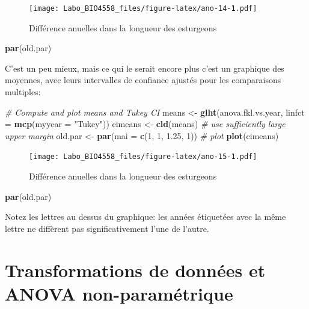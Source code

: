 \documentclass[12pt,]{book}
\newenvironment{Shaded}{\begin{snugshade}}{\end{snugshade}}
\newcommand{\CommentTok}[1]{\textcolor[rgb]{0.37,0.37,0.37}{\textit{#1}}}
\newcommand{\DataTypeTok}[1]{\textcolor[rgb]{0.27,0.27,0.27}{#1}}
\newcommand{\DecValTok}[1]{\textcolor[rgb]{0.06,0.06,0.06}{#1}}
\newcommand{\FloatTok}[1]{\textcolor[rgb]{0.06,0.06,0.06}{#1}}
\newcommand{\KeywordTok}[1]{\textcolor[rgb]{0.27,0.27,0.27}{\textbf{#1}}}
\newcommand{\NormalTok}[1]{#1}
\newcommand{\StringTok}[1]{\textcolor[rgb]{0.5,0.5,0.5}{#1}}
\begin{document}
\begin{figure}
\centering
\texttt{[image: Labo\_BIO4558\_files/figure-latex/ano-14-1.pdf]}
\caption{\label{fig:ano-14}Différence anuelles dans la longueur des esturgeons}
\end{figure}

\begin{Shaded}
\begin{Highlighting}[]
\KeywordTok{par}\NormalTok{(old.par)}
\end{Highlighting}
\end{Shaded}

C'est un peu mieux, mais ce qui le serait encore plus c'est un graphique des moyennes, avec leurs intervalles de confiance ajustés pour les comparaisons multiples:

\begin{Shaded}
\begin{Highlighting}[]
\CommentTok{# Compute and plot means and Tukey CI}
\NormalTok{means <-}\StringTok{ }\KeywordTok{glht}\NormalTok{(anova.fkl.vs.year, }\DataTypeTok{linfct =} \KeywordTok{mcp}\NormalTok{(}\DataTypeTok{myyear =}
\StringTok{"Tukey"}\NormalTok{))}
\NormalTok{cimeans <-}\StringTok{ }\KeywordTok{cld}\NormalTok{(means)}
\CommentTok{# use sufficiently large upper margin}
\NormalTok{old.par <-}\StringTok{ }\KeywordTok{par}\NormalTok{(}\DataTypeTok{mai =} \KeywordTok{c}\NormalTok{(}\DecValTok{1}\NormalTok{, }\DecValTok{1}\NormalTok{, }\FloatTok{1.25}\NormalTok{, }\DecValTok{1}\NormalTok{))}
\CommentTok{# plot}
\KeywordTok{plot}\NormalTok{(cimeans)}
\end{Highlighting}
\end{Shaded}

\begin{figure}
\centering
\texttt{[image: Labo\_BIO4558\_files/figure-latex/ano-15-1.pdf]}
\caption{\label{fig:ano-15}Différence anuelles dans la longueur des esturgeons}
\end{figure}

\begin{Shaded}
\begin{Highlighting}[]
\KeywordTok{par}\NormalTok{(old.par)}
\end{Highlighting}
\end{Shaded}

Notez les lettres au dessus du graphique: les années étiquetées avec la même lettre ne diffèrent pas significativement l'une de l'autre.

\hypertarget{transformations-de-donnuxe9es-et-anova-non-paramuxe9trique}{%
\section{Transformations de données et ANOVA non-paramétrique}\label{transformations-de-donnuxe9es-et-anova-non-paramuxe9trique}}
\end{document}
